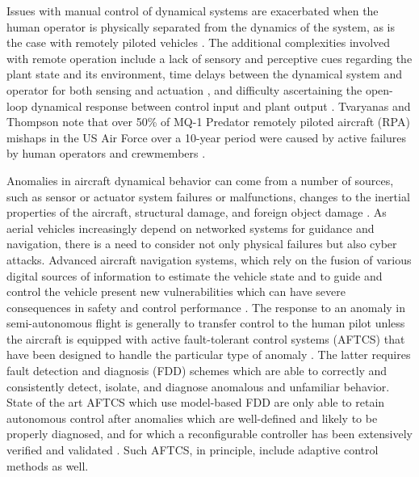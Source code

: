 
Issues with manual control of dynamical systems are exacerbated when the human operator is physically separated from the dynamics of the system, as is the case with remotely piloted vehicles \cite{mccarley2004human, tvaryanas2008recurrent}. The additional complexities involved with remote operation include a lack of sensory and perceptive cues regarding the plant state and its environment, time delays between the dynamical system and operator for both sensing and actuation , and difficulty ascertaining the open-loop dynamical response between control input and plant output \cite{lam2009artificial, lam2008haptic}. Tvaryanas and Thompson note that over 50\% of MQ-1 Predator remotely piloted aircraft (RPA) mishaps in the US Air Force over a 10-year period were caused by active failures by human operators and crewmembers \cite{tvaryanas2008recurrent}. 

Anomalies in aircraft dynamical behavior can come from a number of sources, such as sensor or actuator system failures or malfunctions, changes to the inertial properties of the aircraft, structural damage, and foreign object damage \cite{belcastro2016aircraft}. As aerial vehicles increasingly depend on networked systems for guidance and navigation, there is a need to consider not only physical failures but also cyber attacks. Advanced aircraft navigation systems, which rely on the fusion of various digital sources of information to estimate the vehicle state and to guide and control the vehicle present new vulnerabilities which can have severe consequences in safety and control performance \cite{kim2012cyber, kerns2014unmanned, kwon2014analysis, amin2009safe}. The response to an anomaly in semi-autonomous flight is generally to transfer control to the human pilot unless the aircraft is equipped with active fault-tolerant control systems (AFTCS) that have been designed to handle the particular type of anomaly \cite{zhang2008bibliographical}. The latter requires fault detection and diagnosis (FDD) schemes which are able to correctly and consistently detect, isolate, and diagnose anomalous and unfamiliar behavior. State of the art AFTCS which use model-based FDD are only able to retain autonomous control after anomalies which are well-defined and likely to be properly diagnosed, and for which a reconfigurable controller has been extensively verified and validated \cite{zhang2008bibliographical}. Such AFTCS, in principle, include adaptive control methods as well.

